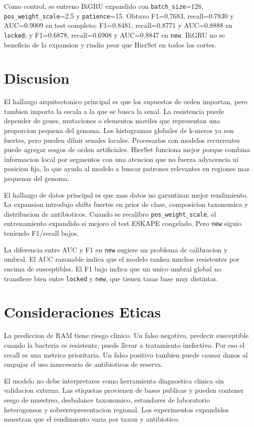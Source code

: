 \documentclass[journal,transmag]{../ieee_latex_template/IEEEtran}
\begin{document}
Como control, se entreno BiGRU expandido con \texttt{batch\_size}=128, \texttt{pos\_weight\_scale}=2.5 y \texttt{patience}=15. Obtuvo F1=0.7683, recall=0.7830 y AUC=0.9009 en test completo; F1=0.8481, recall=0.8771 y AUC=0.8888 en \texttt{locked}; y F1=0.6878, recall=0.6908 y AUC=0.8847 en \texttt{new}. BiGRU no se beneficio de la expansion y rindio peor que HierSet en todos los cortes.

\section{Discusion}
El hallazgo arquitectonico principal es que los supuestos de orden importan, pero tambien importa la escala a la que se busca la senal. La resistencia puede depender de genes, mutaciones o elementos moviles que representan una proporcion pequena del genoma. Los histogramas globales de k-meros ya son fuertes, pero pueden diluir senales locales. Procesarlos con modelos recurrentes puede agregar sesgos de orden artificiales. HierSet funciona mejor porque combina informacion local por segmentos con una atencion que no fuerza adyacencia ni posicion fija, lo que ayuda al modelo a buscar patrones relevantes en regiones mas pequenas del genoma.

El hallazgo de datos principal es que mas datos no garantizan mejor rendimiento. La expansion introdujo shifts fuertes en prior de clase, composicion taxonomica y distribucion de antibioticos. Cuando se recalibro \texttt{pos\_weight\_scale}, el entrenamiento expandido si mejoro el test ESKAPE congelado. Pero \texttt{new} siguio teniendo F1/recall bajos.

La diferencia entre AUC y F1 en \texttt{new} sugiere un problema de calibracion y umbral. El AUC razonable indica que el modelo rankea muchos resistentes por encima de susceptibles. El F1 bajo indica que un unico umbral global no transfiere bien entre \texttt{locked} y \texttt{new}, que tienen tasas base muy distintas.

\section{Consideraciones Eticas}
La prediccion de RAM tiene riesgo clinico. Un falso negativo, predecir susceptible cuando la bacteria es resistente, puede llevar a tratamiento inefectivo. Por eso el recall es una metrica prioritaria. Un falso positivo tambien puede causar danos al empujar el uso innecesario de antibioticos de reserva.

El modelo no debe interpretarse como herramienta diagnostica clinica sin validacion externa. Las etiquetas provienen de bases publicas y pueden contener sesgo de muestreo, desbalance taxonomico, estandares de laboratorio heterogeneos y sobrerrepresentacion regional. Los experimentos expandidos muestran que el rendimiento varia por taxon y antibiotico.
\end{document}
